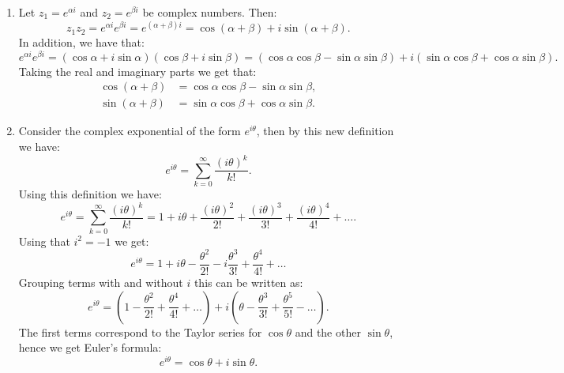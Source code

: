 \begin{enumerate}
\item Let $z_{1}=e^{\alpha i}$ and $z_{2}=e^{\beta i}$ be complex numbers. Then:
$$z_{1}z_{2}=e^{\alpha i}e^{\beta i}=e^{(\alpha+\beta)i}=\cos(\alpha+\beta)+i\sin(\alpha+\beta).$$
In addition, we have that:
$$e^{\alpha i}e^{\beta i}=(\cos\alpha+i\sin\alpha)(\cos\beta+i\sin\beta)=(\cos\alpha\cos\beta-\sin\alpha\sin\beta)+i(\sin\alpha\cos\beta+\cos\alpha\sin\beta).$$
Taking the real and imaginary parts we get that:
\begin{align*}
    \cos(\alpha+\beta) &=\cos\alpha\cos\beta-\sin\alpha\sin\beta, \\
    \sin(\alpha+\beta) &=\sin\alpha\cos\beta+\cos\alpha\sin\beta.
\end{align*}

\item Consider the complex exponential of the form $e^{i\theta}$, then by this new definition we have:
$$e^{i\theta}=\sum_{k=0}^{\infty}\frac{(i\theta)^{k}}{k!}.$$
Using this definition we have:
$$e^{i\theta}=\sum_{k=0}^{\infty}\frac{(i\theta)^{k}}{k!}=1 + i\theta + \frac{(i\theta)^{2}}{2!} + \frac{(i\theta)^{3}}{3!} + \frac{(i\theta)^{4}}{4!} + \hdots.$$
Using that $i^{2}=-1$ we get:
$$e^{i\theta}=1+i\theta-\frac{\theta^{2}}{2!}-i\frac{\theta^{3}}{3!}+\frac{\theta^{4}}{4!}+\hdots$$
Grouping terms with and without $i$ this can be written as:
$$e^{i\theta}=(1-\frac{\theta^{2}}{2!}+\frac{\theta^{4}}{4!}+\hdots)+i(\theta-\frac{\theta^{3}}{3!}+\frac{\theta^{5}}{5!}-\hdots).$$
The first terms correspond to the Taylor series for $\cos \theta$ and the other $\sin \theta$, hence we get Euler's formula:
$$e^{i\theta}=\cos\theta+i\sin\theta.$$

\end{enumerate}
